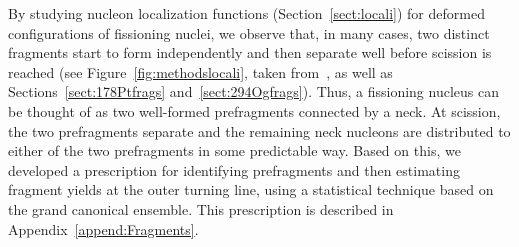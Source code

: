 By studying nucleon localization functions (Section~\ref{sect:locali}) for deformed configurations of fissioning nuclei, we observe that, in many cases, two distinct fragments start to form independently and then separate well before scission is reached (see Figure~\ref{fig:methodslocali}, taken from~\cite{Zhang2016}, as well as Sections~\ref{sect:178Ptfrags} and~\ref{sect:294Ogfrags}). Thus, a fissioning nucleus can be thought of as two well-formed prefragments connected by a neck. At scission, the two prefragments separate and the remaining neck nucleons are distributed to either of the two prefragments in some predictable way. Based on this, we developed a prescription for identifying prefragments and then estimating fragment yields at the outer turning line, using a statistical technique based on the grand canonical ensemble. This prescription is described in Appendix~\ref{append:Fragments}.